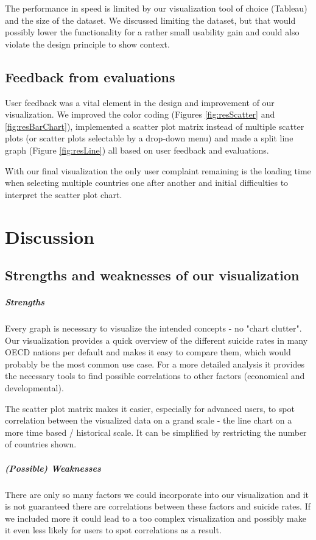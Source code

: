 \documentclass{vgtc}                          %
\begin{document}
The performance in speed is limited by our visualization tool of choice (Tableau) and the size of the dataset. We discussed limiting the dataset, but that would possibly lower the functionality for a rather small usability gain and could also violate the design principle to show context.

\subsection{Feedback from evaluations}
User feedback was a vital element in the design and improvement of our visualization. We improved the color coding (Figures \ref{fig:resScatter} and \ref{fig:resBarChart}), implemented a scatter plot matrix instead of multiple scatter plots (or scatter plots selectable by a drop-down menu) and made a split line graph (Figure \ref{fig:resLine}) all based on user feedback and evaluations.

With our final visualization the only user complaint remaining is the loading time when selecting multiple countries one after another and initial difficulties to interpret the scatter plot chart.

\section{Discussion}

\subsection{Strengths and weaknesses of our visualization}

\subparagraph{Strengths}
Every graph is necessary to visualize the intended concepts - no "chart clutter". Our visualization provides a quick overview of the different suicide rates in many OECD nations per default and makes it easy to compare them, which would probably be the most common use case. For a more detailed analysis it provides the necessary tools to find possible correlations to other factors (economical and developmental).

The scatter plot matrix makes it easier, especially for advanced users, to spot correlation between the visualized data on a grand scale - the line chart on a more time based / historical scale. It can be simplified by restricting the number of countries shown.

\subparagraph{(Possible) Weaknesses}
There are only so many factors we could incorporate into our visualization and it is not guaranteed there are correlations between these factors and suicide rates. If we included more it could lead to a too complex visualization and possibly make it even less likely for users to spot correlations as a result.
\end{document}
